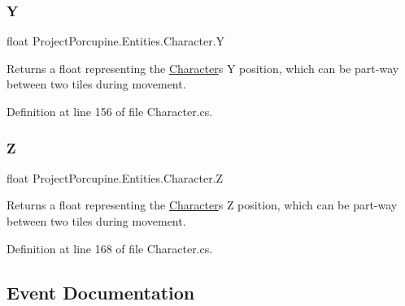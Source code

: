 \subsubsection{\texorpdfstring{Y}{Y}}
{\footnotesize\ttfamily float Project\+Porcupine.\+Entities.\+Character.\+Y\hspace{0.3cm}{\ttfamily [get]}}



Returns a float representing the \hyperlink{class_project_porcupine_1_1_entities_1_1_character}{Character}\textquotesingle{}s Y position, which can be part-\/way between two tiles during movement. 



Definition at line 156 of file Character.\+cs.

\mbox{\label{class_project_porcupine_1_1_entities_1_1_character_a9c149d9a477af33818b602cf6dfa9ea5}} 
\subsubsection{\texorpdfstring{Z}{Z}}
{\footnotesize\ttfamily float Project\+Porcupine.\+Entities.\+Character.\+Z\hspace{0.3cm}{\ttfamily [get]}}



Returns a float representing the \hyperlink{class_project_porcupine_1_1_entities_1_1_character}{Character}\textquotesingle{}s Z position, which can be part-\/way between two tiles during movement. 



Definition at line 168 of file Character.\+cs.



\subsection{Event Documentation}
\mbox{\label{class_project_porcupine_1_1_entities_1_1_character_a6371cd47c886db713e136ddefeb6c108}} 
